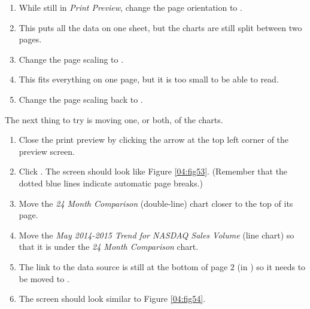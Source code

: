 \begin{enumbox}
	\begin{enumerate}
		\item While still in \textit{Print Preview}, change the page orientation to .
		\item This puts all the data on one sheet, but the charts are still split between two pages.
		\item Change the page scaling to .
		\item This fits everything on one page, but it is too small to be able to read.
		\item Change the page scaling back to .
	\end{enumerate}
\end{enumbox}
	
The next thing to try is moving one, or both, of the charts. 

\begin{enumbox}
	\begin{enumerate}
		\item Close the print preview by clicking the arrow at the top left corner of the preview screen.
		\item Click . The screen should look like Figure \ref{04:fig53}. (Remember that the dotted blue lines indicate automatic page breaks.)
		\item Move the \textit{24 Month Comparison} (double-line) chart closer to the top of its page.
		\item Move the \textit{May 2014-2015 Trend for NASDAQ Sales Volume} (line chart) so that it is under the \textit{24 Month Comparison} chart.
		\item The link to the data source is still at the bottom of page $ 2 $ (in ) so it needs to be moved to .
		\item The screen should look similar to Figure \ref{04:fig54}.
	\end{enumerate}
\end{enumbox}

